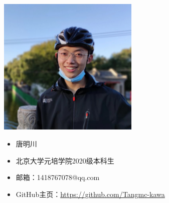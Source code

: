 \begin{figure}[ht]
    \hfill
    \begin{minipage}[c]{0.4\textwidth}
        \includegraphics[width=0.6\textwidth]{./image/author/author-tmc.jpg}
    \end{minipage}
    \hfil
    \begin{minipage}[c]{0.5\textwidth}
        \begin{itemize}
            \item 唐明川
            \item 北京大学元培学院2020级本科生
            \item 邮箱：1418767078@qq.com
            \item GitHub主页：\href{https://github.com/Tangmc-kawa}{https://github.com/Tangmc-kawa}
        \end{itemize}
    \end{minipage}
    \vspace{0.5cm}


\end{figure}
